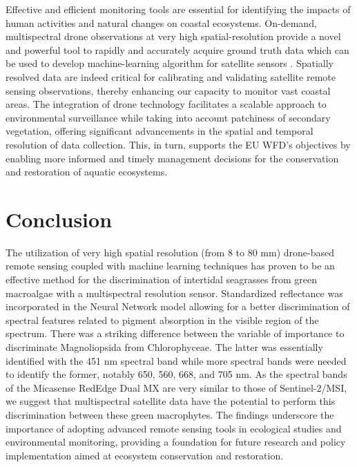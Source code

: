 \documentclass[
  number]{elsarticle}
\begin{document}
Effective and efficient monitoring tools are essential for identifying
the impacts of human activities and natural changes on coastal
ecosystems. On-demand, multispectral drone observations at very high
spatial-resolution provide a novel and powerful tool to rapidly and
accurately acquire ground truth data which can be used to develop
machine-learning algorithm for satellite sensors
\citep{davies2024intertidal}. Spatially resolved data are indeed
critical for calibrating and validating satellite remote sensing
observations, thereby enhancing our capacity to monitor vast coastal
areas. The integration of drone technology facilitates a scalable
approach to environmental surveillance while taking into account
patchiness of secondary vegetation, offering significant advancements in
the spatial and temporal resolution of data collection. This, in turn,
supports the EU WFD's objectives by enabling more informed and timely
management decisions for the conservation and restoration of aquatic
ecosystems.

\section{Conclusion}\label{conclusion}

The utilization of very high spatial resolution (from 8 to 80 mm)
drone-based remote sensing coupled with machine learning techniques has
proven to be an effective method for the discrimination of intertidal
seagrasses from green macroalgae with a multispectral resolution sensor.
Standardized reflectance was incorporated in the Neural Network model
allowing for a better discrimination of spectral features related to
pigment absorption in the visible region of the spectrum. There was a
striking difference between the variable of importance to discriminate
Magnoliopsida from Chlorophyceae. The latter was essentially identified
with the 451 nm spectral band while more spectral bands were needed to
identify the former, notably 650, 560, 668, and 705 nm. As the spectral
bands of the Micasense RedEdge Dual MX are very similar to those of
Sentinel-2/MSI, we suggest that multispectral satellite data have the
potential to perform this discrimination between these green
macrophytes. The findings underscore the importance of adopting advanced
remote sensing tools in ecological studies and environmental monitoring,
providing a foundation for future research and policy implementation
aimed at ecosystem conservation and restoration.


  
\end{document}
